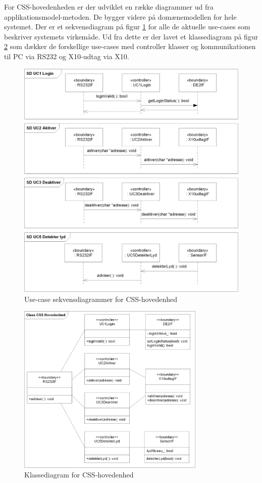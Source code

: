 For CSS-hovedenheden er der udviklet en række diagrammer ud fra applikationsmodel-metoden. De bygger videre på domænemodellen for hele systemet.
Der er et sekvensdiagram på figur \ref{fig:CSS_hovedenhed_SD} for alle de aktuelle use-cases som beskriver systemets virkemåde.
Ud fra dette er der lavet et klassediagram på figur \ref{fig:CSS_hovedenhed_Class} som dækker de forskellige use-cases med controller klasser og kommunikationen til PC via RS232 og X10-udtag via X10.


\begin{figure}[!htb]
	\includegraphics[width=\textwidth]{billeder/uml/CSS_hovedenhed_SD}
     \caption{Use-case sekvensdiagrammer for CSS-hovedenhed}
     \label{fig:CSS_hovedenhed_SD}
\end{figure}

\begin{figure}[!htb] \centering
     \includegraphics[width=0.8\textwidth]{billeder/uml/CSS_hovedenhed_Class}
     \caption{Klassediagram for CSS-hovedenhed}
     \label{fig:CSS_hovedenhed_Class}
\end{figure}

